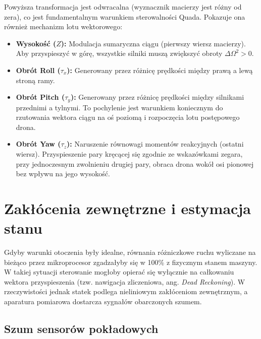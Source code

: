 Powyższa transformacja jest odwracalna (wyznacznik macierzy jest różny od zera), co jest fundamentalnym warunkiem sterowalności Quada. Pokazuje ona również mechanizm lotu wektorowego:
\begin{itemize}
    \item \textbf{Wysokość ($Z$):} Modulacja sumaryczna ciągu (pierwszy wiersz macierzy). Aby przyspieszyć w górę, wszystkie silniki muszą zwiększyć obroty $\Delta \Omega^2 > 0$.
    \item \textbf{Obrót Roll ($\tau_x$):} Generowany przez różnicę prędkości między prawą a lewą stroną ramy. 
    \item \textbf{Obrót Pitch ($\tau_y$):} Generowany przez różnicę prędkości między silnikami przednimi a tylnymi. To pochylenie jest warunkiem koniecznym do rzutowania wektora ciągu na oś poziomą i rozpoczęcia lotu postępowego drona.
    \item \textbf{Obrót Yaw ($\tau_z$):} Naruszenie równowagi momentów reakcyjnych (ostatni wiersz). Przyspieszenie pary kręcącej się zgodnie ze wskazówkami zegara, przy jednoczesnym zwolnieniu drugiej pary, obraca drona wokół osi pionowej bez wpływu na jego wysokość.
\end{itemize}

\section{Zakłócenia zewnętrzne i estymacja stanu}

Gdyby warunki otoczenia były idealne, równania różniczkowe ruchu wyliczane na bieżąco przez mikroprocesor zgadzałyby się w 100\% z fizycznym stanem maszyny. W takiej sytuacji sterowanie mogłoby opierać się wyłącznie na całkowaniu wektora przyspieszenia (tzw. nawigacja zliczeniowa, ang. \textit{Dead Reckoning}). W rzeczywistości jednak statek podlega nieliniowym zakłóceniom zewnętrznym, a aparatura pomiarowa dostarcza sygnałów obarczonych szumem.

\subsection{Szum sensorów pokładowych}

